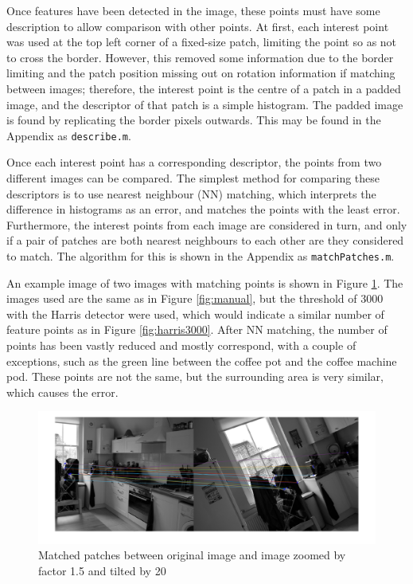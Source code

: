 \documentclass[a4paper, 10pt, conference]{ieeeconf}
\begin{document}
Once features have been detected in the image, these points must have some description to allow comparison with other points. At first, each interest point was used at the top left corner of a fixed-size patch, limiting the point so as not to cross the border. However, this removed some information due to the border limiting and the patch position missing out on rotation information if matching between images; therefore, the interest point is the centre of a patch in a padded image, and the descriptor of that patch is a simple histogram. The padded image is found by replicating the border pixels outwards. This may be found in the Appendix as \texttt{describe.m}.

Once each interest point has a corresponding descriptor, the points from two different images can be compared. The simplest method for comparing these descriptors is to use nearest neighbour (NN) matching, which interprets the difference in histograms as an error, and matches the points with the least error. Furthermore, the interest points from each image are considered in turn, and only if a pair of patches are both nearest neighbours to each other are they considered to match. The algorithm for this is shown in  the Appendix as \texttt{matchPatches.m}. 

An example image of two images with matching points is shown in Figure \ref{fig:matched}. The images used are the same as in Figure \ref{fig:manual}, but the threshold of 3000 with the Harris detector were used, which would indicate a similar number of feature points as in Figure \ref{fig:harris3000}. After NN matching, the number of points has been vastly reduced and mostly correspond, with a couple of exceptions, such as the green line between the coffee pot and the coffee machine pod. These points are not the same, but the surrounding area is very similar, which causes the error.

\begin{figure}[!ht]
  \centering
  \includegraphics[width=\linewidth]{pic/matches}
  \caption{Matched patches between original image and image zoomed by factor 1.5 and tilted by 20\degree}
  \label{fig:matched}
\end{figure}
\end{document}
